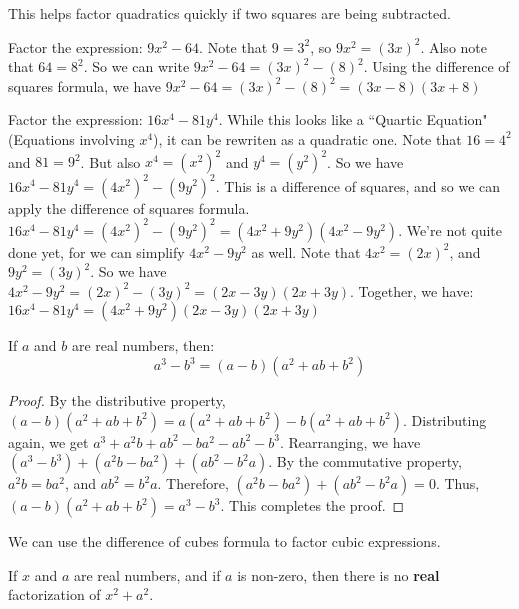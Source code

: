 \documentclass[../main.tex]{subfiles}
\begin{document}
%
\begin{remark}
This helps factor quadratics quickly if two squares are being subtracted.
\end{remark}
%
\begin{example}
Factor the expression: $9x^2 - 64$. Note that $9 = 3^2$, so $9x^2 = (3x)^2$. Also note that $64 = 8^2$. So we can write $9x^2 - 64 = (3x)^2 - (8)^2$. Using the difference of squares formula, we have $9x^2 - 64 = (3x)^2 - (8)^2 = (3x-8)(3x+8)$
\end{example}
%
\begin{example}
Factor the expression: $16x^4 - 81y^4$. While this looks like a ``Quartic Equation" (Equations involving $x^4$), it can be rewriten as a quadratic one. Note that $16 = 4^2$ and $81 = 9^2$. But also $x^4 = (x^2)^2$ and $y^4 = (y^2)^2$. So we have $16x^4-81y^4 = (4x^2)^2 - (9y^2)^2$. This is a difference of squares, and so we can apply the difference of squares formula. $16x^4 - 81y^4 = (4x^2)^2 - (9y^2)^2 = (4x^2 + 9y^2)(4x^2 - 9y^2)$. We're not quite done yet, for we can simplify $4x^2 - 9y^2$ as well. Note that $4x^2 = (2x)^2$, and $9y^2 = (3y)^2$. So we have $4x^2 - 9y^2 = (2x)^2 - (3y)^2 = (2x-3y)(2x+3y)$. Together, we have: $16x^4 - 81y^4 = (4x^2 + 9y^2)(2x-3y)(2x+3y)$
\end{example}
%
\begin{theorem}
\label{theorem:north_shore_difference_of_cubes}
If $a$ and $b$ are real numbers, then:
\begin{equation*}
    a^3 - b^3 = (a-b)(a^2+ab+b^2)
\end{equation*}
\end{theorem}
\begin{proof}
By the distributive property, $(a-b)(a^2+ab+b^2) = a(a^2+ab+b^2) - b(a^2+ab+b^2)$. Distributing again, we get $a^3 + a^2b + ab^2 - ba^2 - ab^2 - b^3$. Rearranging, we have $(a^3 - b^3) + (a^2b - ba^2) + (ab^2 - b^2a)$. By the commutative property, $a^2b = ba^2$, and $ab^2 = b^2a$. Therefore, $(a^2b - ba^2)+(ab^2 - b^2a) = 0$. Thus, $(a-b)(a^2+ab+b^2) = a^3 - b^3$. This completes the proof.
\end{proof}
%
\begin{remark}
We can use the difference of cubes formula to factor cubic expressions.
\end{remark}
%
\begin{theorem}
\label{theorem:north_shore_sum_of_squares}
If $x$ and $a$ are real numbers, and if $a$ is non-zero, then there is no \textbf{real} factorization of $x^2+a^2$.
\end{theorem}
\end{document}
